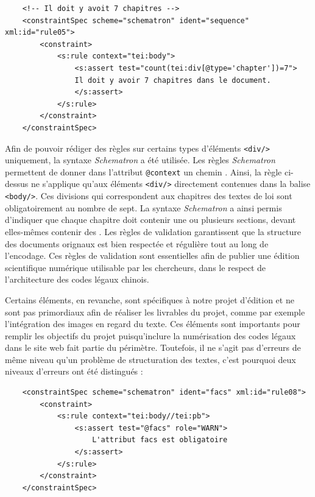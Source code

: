 \begin{verbatim}
    <!-- Il doit y avoit 7 chapitres -->
    <constraintSpec scheme="schematron" ident="sequence" xml:id="rule05">
        <constraint>
            <s:rule context="tei:body">
                <s:assert test="count(tei:div[@type='chapter'])=7"> 
                Il doit y avoir 7 chapitres dans le document. 
                </s:assert>
            </s:rule>
        </constraint>
    </constraintSpec>
\end{verbatim}

Afin de pouvoir rédiger des règles sur certains types d'éléments \texttt{<div/>} uniquement, la syntaxe \textit{Schematron} a été utilisée. Les règles \textit{Schematron} permettent de donner dans l'attribut \texttt{@context} un chemin \xpath. Ainsi, la règle ci-dessus ne s'applique qu'aux éléments \texttt{<div/>} directement contenues dans la balise \texttt{<body/>}. Ces divisions qui correspondent aux chapitres des textes de loi sont obligatoirement au nombre de sept. La syntaxe \textit{Schematron} a ainsi permis d'indiquer que chaque chapitre doit contenir une ou plusieurs sections, devant elles-mêmes contenir des \lu. Les règles de validation garantissent que la structure des documents orignaux est bien respectée et régulière tout au long de l'encodage. Ces règles de validation sont essentielles afin de publier une édition scientifique numérique utilisable par les chercheurs, dans le respect de l'architecture des codes légaux chinois. 

Certains éléments, en revanche, sont spécifiques à notre projet d'édition et ne sont pas primordiaux afin de réaliser les livrables du projet, comme par exemple l'intégration des images en regard du texte. Ces éléments sont importants pour remplir les objectifs du projet puisqu'inclure la numérisation des codes légaux dans le site web fait partie du périmètre. Toutefois, il ne s'agit pas d'erreurs de même niveau qu'un problème de structuration des textes, c'est pourquoi deux niveaux d'erreurs ont été distingués : 

\begin{verbatim}
    <constraintSpec scheme="schematron" ident="facs" xml:id="rule08">
        <constraint>
            <s:rule context="tei:body//tei:pb">
                <s:assert test="@facs" role="WARN"> 
                    L'attribut facs est obligatoire 
                </s:assert>
            </s:rule>
        </constraint>
    </constraintSpec>
\end{verbatim}

